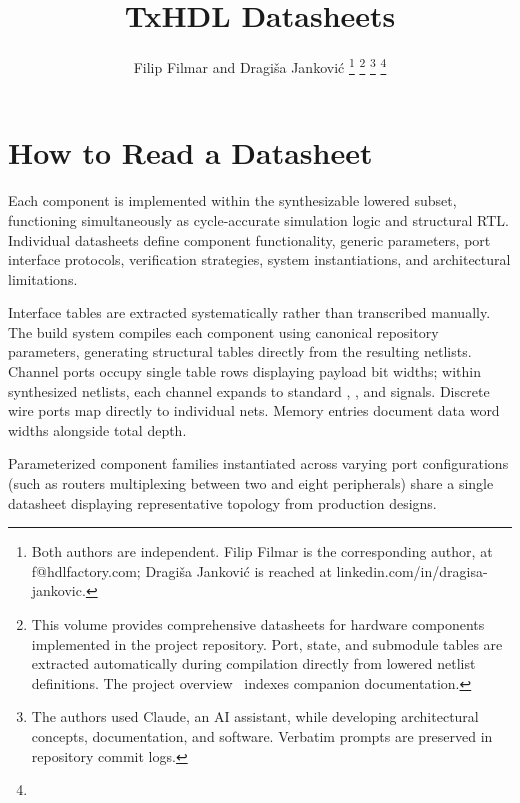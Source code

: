 \documentclass[journal,onecolumn,9pt]{IEEEtran}
\title{TxHDL Datasheets}
\author{Filip Filmar and Dragiša Janković%
\thanks{Both authors are independent. Filip Filmar is the
corresponding author, at f@hdlfactory.com; Dragiša Janković is
reached at linkedin.com/in/dragisa-jankovic.}%
\thanks{This volume provides comprehensive datasheets for hardware components
implemented in the \code{HDL/txhdl} project repository. Port, state, and
submodule tables are extracted automatically during compilation directly from
lowered netlist definitions. The project overview~\cite{cover} indexes companion
documentation.}%
\thanks{The authors used Claude, an AI assistant, while developing
architectural concepts, documentation, and software. Verbatim prompts are
preserved in repository commit logs.}%
\thanks{\buildstamp}}
\begin{document}
\maketitle

\section*{How to Read a Datasheet}

Each component is implemented within the synthesizable lowered subset,
functioning simultaneously as cycle-accurate simulation logic and structural
RTL. Individual datasheets define component functionality, generic parameters,
port interface protocols, verification strategies, system instantiations, and
architectural limitations.

Interface tables are extracted systematically rather than transcribed
manually. The build system compiles each component using canonical repository
parameters, generating structural tables directly from the resulting netlists.
Channel ports occupy single table rows displaying payload bit widths; within
synthesized netlists, each channel expands to standard ,
, and  signals. Discrete wire ports map directly to
individual nets. Memory entries document data word widths alongside total depth.

Parameterized component families instantiated across varying port configurations
(such as routers multiplexing between two and eight peripherals) share a single
datasheet displaying representative topology from production designs.
\end{document}
